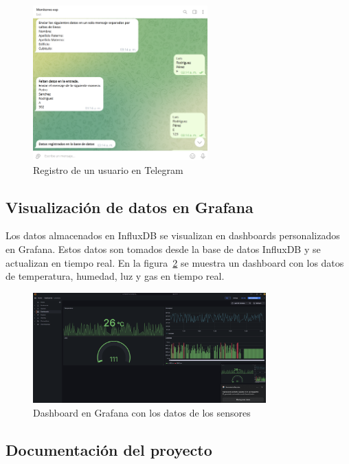 \begin{figure}[H]
    \centering
    \includegraphics[width=0.6\textwidth]{img/proyecto_telegram.png}
    \caption{Registro de un usuario en Telegram}
    \label{fig:registro_telegram}
\end{figure}

\subsection*{Visualización de datos en Grafana}

Los datos almacenados en InfluxDB se visualizan en dashboards personalizados en Grafana. Estos datos son tomados desde la base de datos InfluxDB y se actualizan en tiempo real. En la figura~\ref{fig:grafana} se muestra un dashboard con los datos de temperatura, humedad, luz y gas en tiempo real.

\begin{figure}[H]
    \centering
    \includegraphics[width=0.8\textwidth]{img/proyecto_grafana.png}
    \caption{Dashboard en Grafana con los datos de los sensores}
    \label{fig:grafana}
\end{figure}

\subsection*{Documentación del proyecto}

